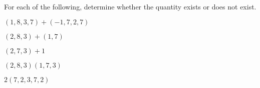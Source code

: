 \begin{problem}
For each of the following, determine whether the quantity exists or does not exist.

$(1,8,3,7)+(-1,7,2,7)$
\begin{multipleChoice}
\end{multipleChoice}

$(2,8,3)+(1,7)$
\begin{multipleChoice}
\end{multipleChoice}

$(2,7,3)+1$
\begin{multipleChoice}
\end{multipleChoice}

$(2,8,3)(1,7,3)$
\begin{multipleChoice}
\end{multipleChoice}

$2(7,2,3,7,2)$
\begin{multipleChoice}
\end{multipleChoice}

\end{problem}
